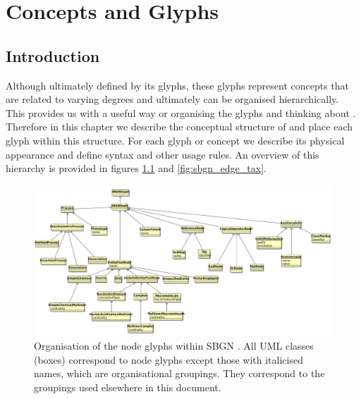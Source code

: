 
\chapter{Concepts and Glyphs}
\label{chp:glyphs}


\section{Introduction}

Although ultimately defined by its glyphs, \SBGNPDLone these glyphs
represent concepts that are related to varying degrees and ultimately
can be organised hierarchically. This provides us with a useful way or
organising the glyphs and thinking about \PD{}.  Therefore in this
chapter we describe the conceptual structure of \SBGNPDLone and place
each glyph within this structure. For each glyph or concept we describe its
physical appearance and define syntax and other usage rules. An
overview of this hierarchy is provided in figures
\ref{fig:sbgn_node_tax} and \ref{fig:sbgn_edge_tax}.

\begin{figure}[htb]
\begin{center}
\includegraphics[width=1.0\linewidth]{images/sbgn_node_taxonomy}
\caption{Organisation of the node glyphs within SBGN \PDl. All UML classes (boxes) correspond to \PD node glyphs except those with italicised names, which are organisational groupings. They correspond to the groupings used elsewhere in this document.}
\label{fig:sbgn_node_tax}
\end{center}
\end{figure}

